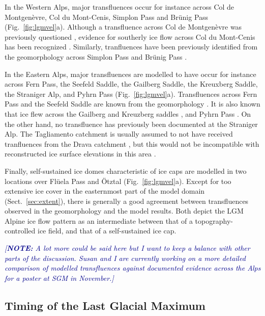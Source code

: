 \documentclass[tc, manuscript]{copernicus}
\newcommand{\note}[1]{\textcolor{darkblue}{\emph{[\textbf{NOTE:} #1]}}}
\begin{document}
    In the Western Alps, major transfluences occur for instance across Col de
    Montgenèvre, Col du Mont-Cenis, Simplon Pass and Brünig Pass
    (Fig.~\ref{fig:lgmvel}a). Although a transfluence across Col de Montgenèvre
    was previously questioned \citep[Fig.~2]{Cossart.etal.2012}, evidence for
    southerly ice flow across Col du Mont-Cenis has been recognized
    \citep[Fig.~3.18, p.~284]{Onde.1938, Coutterand.2010}. Similarly,
    tranfluences have been previously identified from the geomorphology across
    Simplon Pass \citep{Kelly.etal.2004} and Brünig Pass \citep{Jackli.1962}.

    In the Eastern Alps, major transfluences are modelled to have occur for
    instance across Fern Pass, the Seefeld Saddle, the Gailberg Saddle, the
    Kreuxberg Saddle, the Straniger Alp, and Pyhrn Pass
    (Fig.~\ref{fig:lgmvel}a). Transfluences across Fern Pass and the Seefeld
    Saddle are known from the geomorphology
    \citep[Fig.~2.4]{Penck.Bruckner.1909, Husen.2011}. It is also known that
    ice flew across the Gailberg and Kreuzberg saddles \citep{Husen.1985}, and
    Pyhrn Pass \citep[Fig.~\ref{fig:lgmvel}a; cf.][Fig.~2.5]{Husen.2011}.
    On the other hand, no transfluence has previously been documented at the
    Straniger Alp. The Tagliamento catchment is usually assumed to not have
    received tranfluences from the Drava catchment \citep{Monegato.etal.2007},
    but this would not be incompatible with reconstructed ice surface
    elevations in this area \citep{Husen.1987}.

    Finally, self-sustained ice domes characteristic of ice caps are modelled
    in two locations over Flüela Pass and Ötztal (Fig.~\ref{fig:lgmvel}a).
    Except for too extensive ice cover in the easternmost part of the model
    domain (Sect.~\ref{sec:extent}), there is generally a good agreement
    between transfluences observed in the geomorphology and the model results.
    Both depict the LGM Alpine ice flow pattern as an intermediate between that
    of a topography-controlled ice field, and that of a self-sustained ice cap.

    \note{A lot more could be said here but I want to keep a balance with
          other parts of the discussion. Susan and I are currently working on a
          more detailed comparison of modelled transfluences against documented
          evidence across the Alps for a poster at SGM in November.}


\subsection{Timing of the Last Glacial Maximum}
\label{sec:timing}
\end{document}
